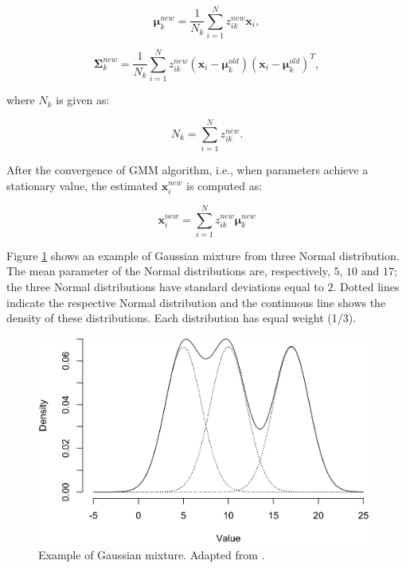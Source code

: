 \begin{equation}
    \bm{\mu}_k^{new} = \frac{1}{N_k} \sum_{i=1}^N z_{ik}^{new} \textbf{x}_i,
\label{mu_new}
\end{equation}

\begin{equation}
    \bm{\Sigma}_k^{new} = \frac{1}{N_k} \sum_{i=1}^N z_{ik}^{new} (\textbf{x}_i-\bm{\mu}_k^{old})(\textbf{x}_i-\bm{\mu}_k^{old})^T,
\label{sigma_new}
\end{equation}

\noindent where $N_k$ is given as:

\begin{equation}
    N_k = \sum_{i=1}^N z_{ik}^{new}.
\end{equation}

After the convergence of GMM algorithm, i.e., when parameters achieve a stationary value, the estimated $\textbf{x}_i^{new}$ is computed as:

\begin{equation}
    \textbf{x}_i^{new} = \sum_{i=1}^N z_{ik}^{new} \bm{\mu}_k^{new}
\end{equation}

Figure \ref{example_mixture} shows an example of Gaussian mixture from three Normal distribution. The mean parameter of the Normal distributions are, respectively, $5$, $10$ and $17$; the three Normal distributions have standard deviations equal to $2$. Dotted lines indicate the respective Normal distribution and the continuous line shows the density of these distributions. Each distribution has equal weight (1/3). 

\begin{figure}[ht]
\centering
\includegraphics[width=11cm]{Part 3 - Learning Systems/Unsupervised Learning/Expectation-Maximization/figures/gaussian_mixture.png}
\caption{Example of Gaussian mixture. Adapted from \cite{Smason79}.}
\label{example_mixture}
\end{figure}


